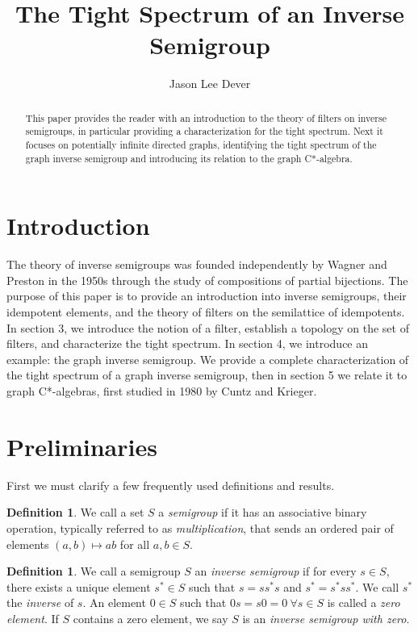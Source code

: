 \documentclass[12pt]{article}
\title{The Tight Spectrum of an Inverse Semigroup}
\author{Jason Lee Dever}
\theoremstyle{definition}
\newtheorem{definition}[theorem]{Definition}
\begin{document}
\date{}
\maketitle

\begin{abstract}
    This paper provides the reader with an introduction to the theory of filters
    on inverse semigroups, in particular providing a characterization for the
    tight spectrum. Next it focuses on potentially infinite directed graphs,
    identifying the tight spectrum of the graph inverse semigroup and introducing
    its relation to the graph C*-algebra.
\end{abstract}

\section{Introduction}
The theory of inverse semigroups was founded independently by Wagner and Preston in the 1950s
through the study of compositions of partial bijections. The purpose of this paper is to provide an introduction into inverse
semigroups, their idempotent elements, and the theory of filters on the semilattice
of idempotents. In section 3, we introduce the notion of a filter, establish
a topology on the set of filters, and characterize the tight spectrum.
In section 4, we introduce an example: the graph inverse semigroup.
We provide a complete characterization of the tight spectrum of a graph inverse semigroup,
then in section 5 we relate it to graph C*-algebras, first studied in 1980 by Cuntz
and Krieger.

\section{Preliminaries}
First we must clarify a few frequently used definitions and results.

\begin{definition}
    We call a set $S$ a \emph{semigroup} if it has an associative binary operation,
    typically referred to as \emph{multiplication}, that sends an ordered pair of 
    elements $(a, b) \mapsto ab$ for all $a, b \in S$.
\end{definition}

\begin{definition}
    We call a semigroup $S$ an \emph{inverse semigroup} if for every $s \in S$, there exists a unique
    element $s^* \in S$ such that $s = ss^*s$ and $s^* = s^*ss^*$. We call $s^*$ the \emph{inverse} of $s$.
    An element $0 \in S$ such that $0s = s0 = 0 \ \forall s \in S$ is called a \emph{zero element}.
    If $S$ contains a zero element, we say $S$ is an \emph{inverse semigroup with zero}.
\end{definition}
\end{document}
